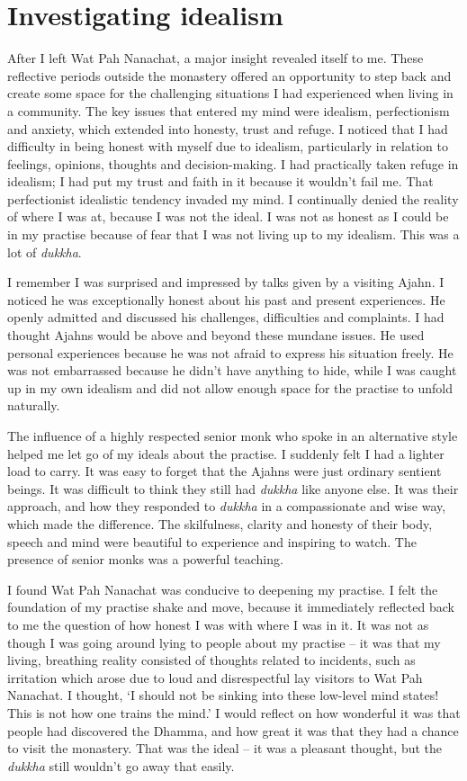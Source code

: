 \section{Investigating idealism}

After I left Wat Pah Nanachat, a major insight revealed itself to me. 
These reflective periods outside the monastery offered an opportunity to
step back and create some space for the challenging situations I had
experienced when living in a community. The key issues that entered my
mind were idealism, perfectionism and anxiety, which extended into
honesty, trust and refuge. I noticed that I had difficulty in being
honest with myself due to idealism, particularly in relation to
feelings, opinions, thoughts and decision-making. I had practically
taken refuge in idealism; I had put my trust and faith in it because it
wouldn't fail me. That perfectionist idealistic tendency invaded my
mind. I continually denied the reality of where I was at, because I was
not the ideal. I was not as honest as I could be in my practise because
of fear that I was not living up to my idealism. This was a lot of
\emph{dukkha}. 

I remember I was surprised and impressed by talks given by a visiting
Ajahn. I noticed he was exceptionally honest about his past and present
experiences. He openly admitted and discussed his challenges, 
difficulties and complaints. I had thought Ajahns would be above and
beyond these mundane issues. He used personal experiences because he was
not afraid to express his situation freely. He was not embarrassed
because he didn't have anything to hide, while I was caught up in my own
idealism and did not allow enough space for the practise to unfold
naturally.

The influence of a highly respected senior monk who spoke in
an alternative style helped me let go of my ideals about the practise. I
suddenly felt I had a lighter load to carry. It was easy to forget that
the Ajahns were just ordinary sentient beings. It was
difficult to think they still had \emph{dukkha} like anyone else. It was
their approach, and how they responded to \emph{dukkha} in a
compassionate and wise way, which made the difference. The skilfulness, 
clarity and honesty of their body, speech and mind were beautiful to
experience and inspiring to watch. The presence of senior monks was a
powerful teaching. 

I found Wat Pah Nanachat was conducive to deepening my practise. I felt
the foundation of my practise shake and move, because it immediately
reflected back to me the question of how honest I was with where I was
in it. It was not as though I was going around lying to people about my
practise -- it was that my living, breathing reality consisted of
thoughts related to incidents, such as irritation which arose due to
loud and disrespectful lay visitors to Wat Pah Nanachat. I thought, `I
should not be sinking into these low-level mind states! This is not how
one trains the mind.' I would reflect on how wonderful it was that
people had discovered the Dhamma, and how great it was that they had a
chance to visit the monastery. That was the ideal -- it was a pleasant
thought, but the \emph{dukkha} still wouldn't go away that easily.

